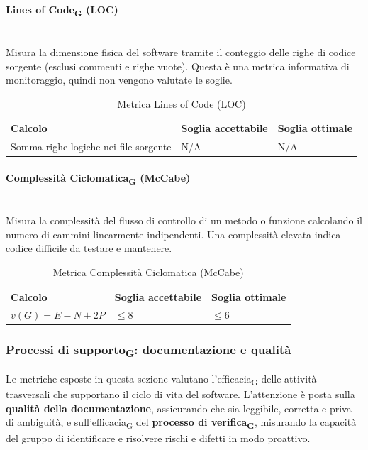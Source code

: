 \documentclass[11pt,a4paper]{article}
\newcommand{\gls}[1]{#1\textsubscript{G}}
\begin{document}
\paragraph{Lines of Code\textsubscript{G} (LOC)} \hfill \\
Misura la dimensione fisica del software tramite il conteggio delle righe di codice sorgente (esclusi commenti e righe vuote). Questa è una metrica informativa di monitoraggio, quindi non vengono valutate le soglie.

\begin{table}[H]
    \centering
    \renewcommand{\arraystretch}{1.5}
    \begin{tabular}{|M{0.4\textwidth}|M{0.25\textwidth}|M{0.25\textwidth}|}
        \hline
        \textbf{Calcolo} & \textbf{Soglia accettabile} & \textbf{Soglia ottimale} \\
        \hline
        Somma righe logiche nei file sorgente & N/A & N/A \\
        \hline
    \end{tabular}
    \caption{Metrica Lines of Code (LOC)}
\end{table}

\paragraph{Complessità Ciclomatica\textsubscript{G} (McCabe)} \hfill \\
Misura la complessità del flusso di controllo di un metodo o funzione calcolando il numero di cammini linearmente indipendenti. Una complessità elevata indica codice difficile da testare e mantenere.

\begin{table}[H]
    \centering
    \renewcommand{\arraystretch}{1.5}
    \begin{tabular}{|M{0.4\textwidth}|M{0.25\textwidth}|M{0.25\textwidth}|}
        \hline
        \textbf{Calcolo} & \textbf{Soglia accettabile} & \textbf{Soglia ottimale} \\
        \hline
        $v(G) = E - N + 2P$ & $\le 8$ & $\le 6$ \\
        \hline
    \end{tabular}
    \caption{Metrica Complessità Ciclomatica (McCabe)}
\end{table}

\newpage
\subsubsection{\gls{Processi di supporto}: documentazione e qualità}
Le metriche esposte in questa sezione valutano l'\gls{efficacia} delle attività trasversali che supportano il ciclo di vita del software.
L'attenzione è posta sulla \textbf{qualità della documentazione}, assicurando che sia leggibile, corretta e priva di ambiguità, e sull'\gls{efficacia} del \textbf{processo di \gls{verifica}}, misurando la capacità del gruppo di identificare e risolvere rischi e difetti in modo proattivo.
\end{document}
